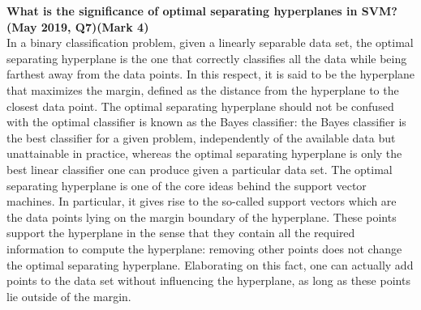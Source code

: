 \textbf{\textcolor{LightMagenta}{What is the significance of optimal separating hyperplanes in SVM?  (May 2019, Q7)\hfill (Mark 4)}} \\[5pt]
In a binary classification problem, given a linearly separable data set, the optimal
separating hyperplane is the one that correctly classifies all the data while being
farthest away from the data points. In this respect, it is said to be the hyperplane
that maximizes the margin, defined as the distance from the hyperplane to the
closest data point.
The optimal separating hyperplane should not be confused with the optimal 
classifier is known as the Bayes classifier: the Bayes classifier is the best classifier 
for a given problem, independently of the available data but unattainable in
practice, whereas the optimal separating hyperplane is only the best linear
classifier one can produce given a particular data set.
The optimal separating hyperplane is one of the core ideas behind the support
vector machines. In particular, it gives rise to the so-called support vectors which are the data points lying on the margin boundary of the hyperplane. These points support the hyperplane in the sense that they contain all the required information to compute the hyperplane: removing other points does not change the optimal separating hyperplane. Elaborating on this fact, one can actually add points to the data set without influencing the hyperplane, as long as these points lie
outside of the margin.

